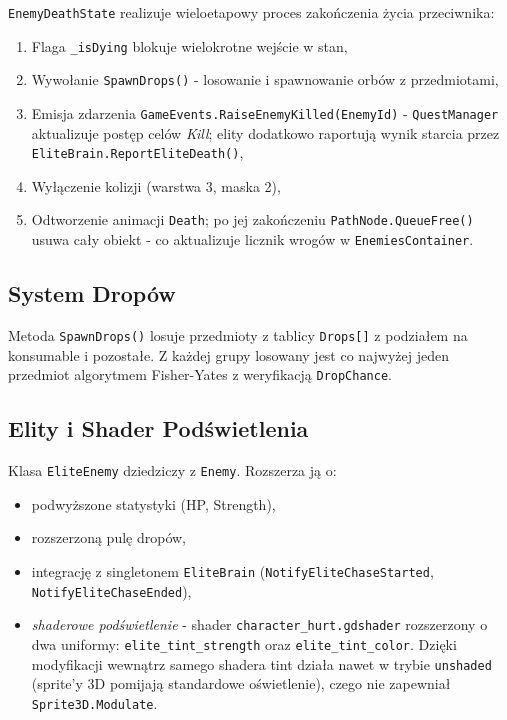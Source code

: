 \texttt{EnemyDeathState} realizuje wieloetapowy proces zakończenia życia przeciwnika:

\begin{enumerate}
    \item Flaga \texttt{\_isDying} blokuje wielokrotne wejście w stan,
    \item Wywołanie \texttt{SpawnDrops()} - losowanie i spawnowanie orbów z przedmiotami,
    \item Emisja zdarzenia \texttt{GameEvents.RaiseEnemyKilled(EnemyId)} - \texttt{QuestManager} aktualizuje postęp celów \textit{Kill}; elity dodatkowo raportują wynik starcia przez \texttt{EliteBrain.ReportEliteDeath()},
    \item Wyłączenie kolizji (warstwa 3, maska 2),
    \item Odtworzenie animacji \texttt{Death}; po jej zakończeniu \texttt{PathNode.QueueFree()} usuwa cały obiekt - co aktualizuje licznik wrogów w \texttt{EnemiesContainer}.
\end{enumerate}

\subsection{System Dropów}

Metoda \texttt{SpawnDrops()} losuje przedmioty z tablicy \texttt{Drops[]} z podziałem na konsumable i pozostałe. Z każdej grupy losowany jest co najwyżej jeden przedmiot algorytmem Fisher-Yates z weryfikacją \texttt{DropChance}.

\subsection{Elity i Shader Podświetlenia}

Klasa \texttt{EliteEnemy} dziedziczy z \texttt{Enemy}. Rozszerza ją o:
\begin{itemize}
    \item podwyższone statystyki (HP, Strength),
    \item rozszerzoną pulę dropów,
    \item integrację z singletonem \texttt{EliteBrain} (\texttt{NotifyEliteChaseStarted}, \texttt{NotifyEliteChaseEnded}),
    \item \emph{shaderowe podświetlenie} - shader \texttt{character\_\allowbreak hurt.\allowbreak gdshader} rozszerzony o dwa uniformy: \texttt{elite\_\allowbreak tint\_\allowbreak strength} oraz \texttt{elite\_\allowbreak tint\_\allowbreak color}. Dzięki modyfikacji wewnątrz samego shadera tint działa nawet w trybie \texttt{unshaded} (sprite'y 3D pomijają standardowe oświetlenie), czego nie zapewniał \texttt{Sprite3D.\allowbreak Modulate}.
\end{itemize}

